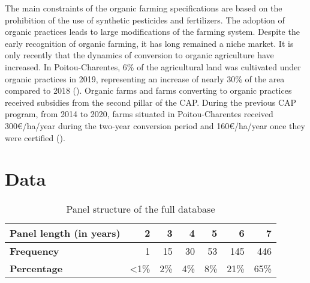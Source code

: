 \begin{Article}
\begin{refsection}[Lassalas]
The main constraints of the organic farming specifications are based on
the prohibition of the use of synthetic pesticides and fertilizers. The
adoption of organic practices leads to large modifications of the
farming system. Despite the early recognition of organic farming, it has
long remained a niche market. It is only recently that the dynamics of
conversion to organic agriculture have increased. In Poitou-Charentes,
6\% of the agricultural land was cultivated under organic practices in
2019, representing an increase of nearly 30\% of the area compared to
2018 (\textcite{interbio_2021}). Organic farms and farms
converting to organic practices received subsidies from the second
pillar of the CAP. During the previous CAP program, from 2014 to 2020,
farms situated in Poitou-Charentes received 300€/ha/year during the
two-year conversion period and 160€/ha/year once they were certified
(\textcite{Chambre2018}).

\section{Data}

\vspace{-5mm} %

\begin{table}[!h]
\centering
\caption {Panel structure of the full database}
\label{Tablestructure}
\begin{tabular}{lrrrrrr}
\midrule
\textbf{Panel length (in years)} & 2 & 3 & 4 & 5 & 6 & 7\\
\midrule
\textbf{Frequency} & 1 & 15 & 30 & 53 & 145 & 446 \\
\textbf{Percentage} & \textless1\% & 2\% & 4\% & 8\% & 21\% & 65\% \\
\midrule
\end{tabular}
\end{table}



\end{refsection}
\end{Article}

